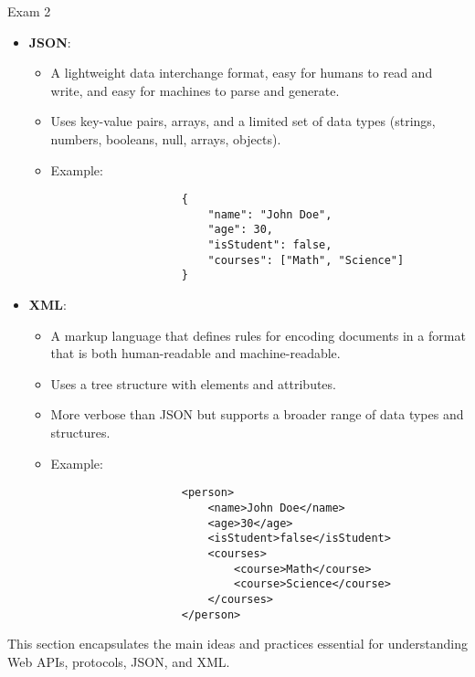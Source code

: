 \begin{examnotes}{Exam 2}
\begin{highlight}
        \begin{itemize}
            \item \textbf{JSON}:
                \begin{itemize}
                    \item A lightweight data interchange format, easy for humans to read and write, and easy for machines to parse and generate.
                    \item Uses key-value pairs, arrays, and a limited set of data types (strings, numbers, booleans, null, arrays, objects).
                    \item Example:
                    \begin{verbatim}
                    {
                        "name": "John Doe",
                        "age": 30,
                        "isStudent": false,
                        "courses": ["Math", "Science"]
                    }
                    \end{verbatim}
                \end{itemize}
            \item \textbf{XML}:
                \begin{itemize}
                    \item A markup language that defines rules for encoding documents in a format that is both human-readable and machine-readable.
                    \item Uses a tree structure with elements and attributes.
                    \item More verbose than JSON but supports a broader range of data types and structures.
                    \item Example:
                    \begin{verbatim}
                    <person>
                        <name>John Doe</name>
                        <age>30</age>
                        <isStudent>false</isStudent>
                        <courses>
                            <course>Math</course>
                            <course>Science</course>
                        </courses>
                    </person>
                    \end{verbatim}
                \end{itemize}
        \end{itemize}
    \end{highlight}
    
    \begin{highlight}
        This section encapsulates the main ideas and practices essential for understanding Web APIs, protocols, JSON, and XML.
        

\end{highlight}
\end{examnotes}
